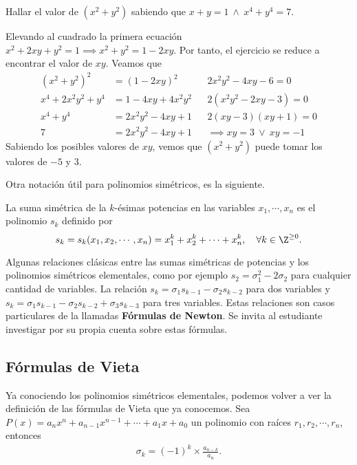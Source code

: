 \begin{example}
    Hallar el valor de $(x^2 + y^2)$ sabiendo que $x + y = 1\ \land\ x^4 + y^4 = 7$.
\end{example}
\begin{solution}
    Elevando al cuadrado la primera ecuación $x^2 + 2xy + y^2 = 1 \implies x^2 + y^2 = 1 - 2xy$.
    Por tanto, el ejercicio se reduce a encontrar el valor de $xy$.
    Veamos que
    \begin{align*}
        (x^2 + y^2)^2 &= (1 - 2xy)^2 && 2x^2 y^2 - 4xy - 6 = 0\\
        x^4 + 2x^2 y^2 + y^4 &= 1 - 4xy + 4x^2 y^2 && 2(x^2 y^2 - 2xy - 3) = 0\\
        x^4 + y^4 &= 2x^2 y^2 - 4xy + 1 && 2(xy - 3)(xy + 1) = 0\\
        7 &= 2x^2 y^2 - 4xy + 1 && \implies xy = 3\ \lor \ xy = -1
    \end{align*}
    Sabiendo los posibles valores de $xy$, vemos que $(x^2 + y^2)$ puede tomar los valores de $-5$ y 3.
\end{solution}

Otra notación útil para polinomios simétricos, es la siguiente.

\begin{definition}
    La suma simétrica de la $k$-ésimas potencias en las variables $x_1, \cdots, x_n$ es el polinomio $s_k$ definido por
    \[s_k = s_k(x_1, x_2, \cdots, x_n) = x_1^k + x_2^k + \cdots + x_n^k, \quad \forall k \in \Z^{\geq 0}.\]
\end{definition}

Algunas relaciones clásicas entre las sumas simétricas de potencias y los polinomios simétricos elementales, como por ejemplo $s_2 = \sigma_1^2 - 2\sigma_2$ para cualquier cantidad de variables.
La relación $s_k = \sigma_1 s_{k - 1} - \sigma_2 s_{k - 2}$ para dos variables y $s_k = \sigma_1 s_{k - 1} - \sigma_2 s_{k - 2} + \sigma_3 s_{k - 3}$ para tres variables.
Estas relaciones son casos particulares de la llamadas \textbf{Fórmulas de Newton}.
Se invita al estudiante investigar por su propia cuenta sobre estas fórmulas.



\subsection{Fórmulas de Vieta}

Ya conociendo los polinomios simétricos elementales, podemos volver a ver la definición de las fórmulas de Vieta que ya conocemos.
Sea $P(x) = a_n x^n + a_{n - 1} x^{n - 1} + \cdots  + a_1 x + a_0$ un polinomio con raíces $r_1, r_2, \cdots, r_n$,
entonces
\begin{gather*}
    \sigma_k = (-1)^k\times \frac{a_{n - k}}{a_n}.
\end{gather*}

